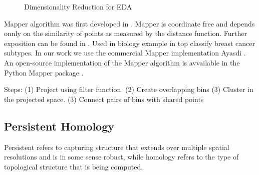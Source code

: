 \begin{figure}
\caption[Dimensionality Reduction for EDA]{Dimensionality Reduction for EDA}
\label{background:fig:eda}
\end{figure}


Mapper algorithm was first developed in \cite{Singh:2007ve}.
Mapper is coordinate free and depends onnly on the similarity of points as measured by the distance function.
Further exposition can be found in \cite{Lum:2013cz}.
Used in biology example in \cite{Nicolau:2011} top classify breast cancer subtypes.
In our work we use the commercial Mapper implementation Ayasdi \cite{AyasdiIris:2015}.
An open-source implementation of the Mapper algorithm is avvailable in the Python Mapper package \cite{Mullner:2013}.

Steps:
(1) Project using filter function.
(2) Create overlapping bins
(3) Cluster in the projected space.
(3) Connect pairs of bins with shared points

\subsection{Persistent Homology}
\label{background:ss:persistent_homology}

Persistent refers to capturing structure that extends over multiple spatial resolutions and is in some sense robust, while homology refers to the type of topological structure that is being computed.

